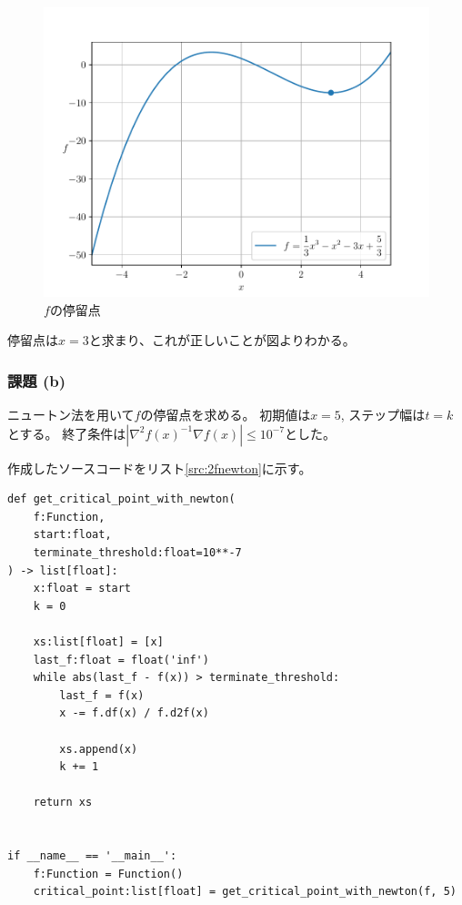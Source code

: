 \documentclass[a4j, titlepage]{jsarticle}
\numberwithin{equation}{section}
\begin{document}
            \begin{figure}[h]
                \centering
                \includegraphics[width=0.8\hsize]{kadai2/a.pdf}
                \caption{$f$の停留点}
                \label{fig:2f}
            \end{figure}

            停留点は$x=3$と求まり、これが正しいことが図よりわかる。

        \subsubsection{課題 (b)} \label{sec:2b}
            ニュートン法を用いて$f$の停留点を求める。
            初期値は$x=5$,
            ステップ幅は$t=k$とする。
            終了条件は$|\nabla^2f(x)^{-1}\nabla f(x)|\leq 10^{-7}$とした。

            作成したソースコードをリスト\ref{src:2fnewton}に示す。

            \begin{lstlisting}[caption=ニュートン法の実装, label=src:2fnewton]
def get_critical_point_with_newton(
    f:Function,
    start:float,
    terminate_threshold:float=10**-7
) -> list[float]:
    x:float = start
    k = 0
    
    xs:list[float] = [x]
    last_f:float = float('inf')
    while abs(last_f - f(x)) > terminate_threshold:
        last_f = f(x)
        x -= f.df(x) / f.d2f(x)
        
        xs.append(x)
        k += 1
    
    return xs


if __name__ == '__main__':
    f:Function = Function()
    critical_point:list[float] = get_critical_point_with_newton(f, 5)
            \end{lstlisting}
\end{document}
